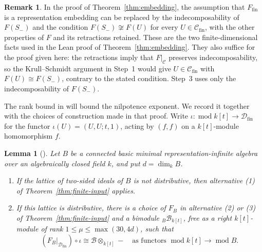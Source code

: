 \documentclass[a4paper,reqno,10pt]{amsart}
\newtheorem{lemma}[theorem]{Lemma}
\theoremstyle{definition}
\newtheorem{remark}[theorem]{Remark}
\DeclareMathOperator{\md}{mod}
\newcommand{\dm}{\dim_k}
\newcommand{\D}{\mathcal D}
\newcommand{\C}{\mathcal C}
\numberwithin{equation}{section}
\begin{document}
\begin{remark}\label{rem:weaker-finite-input}
In the proof of Theorem~\ref{thm:embedding}, the assumption that
$F_{\mathrm{fin}}$ is a representation embedding can be replaced by
the indecomposability of $F(S_-)$ and the condition
$F(S_-)\not\cong F(U)$ for every $U\in\C_{\mathrm{fin}}$, with the
other properties of $F$ and its retractions retained.
These are the two finite-dimensional facts used in the Lean proof of
Theorem~\ref{thm:embedding}. They also suffice for the proof given here:
the retractions imply that $F|_\C$ preserves indecomposability, so the
Krull--Schmidt argument in Step~1 would give $U\in\C_{\mathrm{fin}}$
with $F(U)\cong F(S_-)$, contrary to the stated condition. Step~3 uses
only the indecomposability of $F(S_-)$.
\end{remark}

The rank bound in \cite[Theorem~7]{Bongartz} will bound the nilpotence exponent.
We record it together with the choices of construction made in that proof.
Write
$\iota:\md k[t]\to\D_{\mathrm{fin}}$ for the functor
$\iota(U)=(U,U;t,1)$, acting by $(f,f)$ on a $k[t]$-module homomorphism $f$.
\begin{lemma}[{\cite[\S5.2, Theorem~7 and \S5.4]{Bongartz}}]
\label{lem:quantitative-input}
Let $B$ be a connected basic minimal representation-infinite algebra
over an algebraically closed field $k$, and put $d=\dm B$.
\begin{enumerate}
\item If the lattice of two-sided ideals of $B$ is not distributive,
then alternative (1) of Theorem~\ref{thm:finite-input} applies.
\item If this lattice is distributive, there is a choice of $F_B$ in
alternative (2) or (3) of Theorem~\ref{thm:finite-input} and a bimodule
${}_B\mathcal B_{k[t]}$, free as a right $k[t]$-module of rank
$1\le \mu\le\max(30,4d)$, such that
\[
 (F_B|_{\D_{\mathrm{fin}}})\circ\iota\cong \mathcal B\otimes_{k[t]}-
 \quad\text{as functors }\md k[t]\longrightarrow\md B.
\]
\end{enumerate}
\end{lemma}
\end{document}
